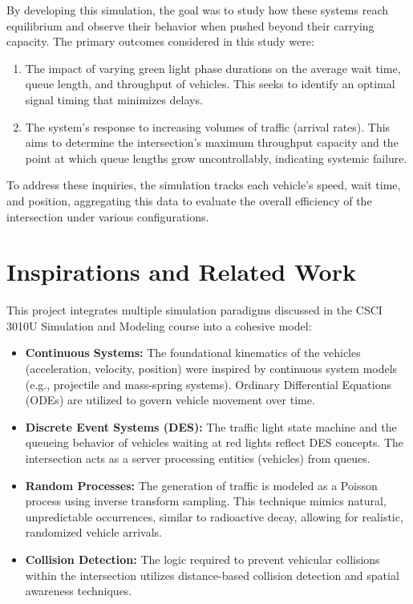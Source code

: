 \documentclass[12pt, letterpaper, twoside]{article}
\begin{document}
By developing this simulation, the goal was to study how these systems reach equilibrium and observe their behavior when pushed beyond their carrying capacity. The primary outcomes considered in this study were:
\begin{enumerate}
    \item The impact of varying green light phase durations on the average wait time, queue length, and throughput of vehicles. This seeks to identify an optimal signal timing that minimizes delays.
    \item The system's response to increasing volumes of traffic (arrival rates). This aims to determine the intersection's maximum throughput capacity and the point at which queue lengths grow uncontrollably, indicating systemic failure.
\end{enumerate}

To address these inquiries, the simulation tracks each vehicle's speed, wait time, and position, aggregating this data to evaluate the overall efficiency of the intersection under various configurations.

\section{Inspirations and Related Work}
\label{sec:related}
This project integrates multiple simulation paradigms discussed in the CSCI 3010U Simulation and Modeling course into a cohesive model:
\begin{itemize}
    \item \textbf{Continuous Systems:} The foundational kinematics of the vehicles (acceleration, velocity, position) were inspired by continuous system models (e.g., projectile and mass-spring systems). Ordinary Differential Equations (ODEs) are utilized to govern vehicle movement over time.
    \item \textbf{Discrete Event Systems (DES):} The traffic light state machine and the queueing behavior of vehicles waiting at red lights reflect DES concepts. The intersection acts as a server processing entities (vehicles) from queues.
    \item \textbf{Random Processes:} The generation of traffic is modeled as a Poisson process using inverse transform sampling. This technique mimics natural, unpredictable occurrences, similar to radioactive decay, allowing for realistic, randomized vehicle arrivals.
    \item \textbf{Collision Detection:} The logic required to prevent vehicular collisions within the intersection utilizes distance-based collision detection and spatial awareness techniques.
\end{itemize}
\end{document}
